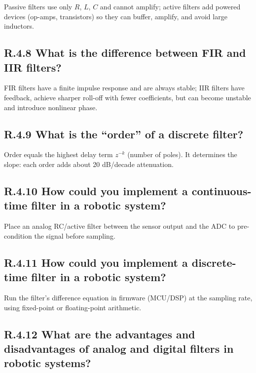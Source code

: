 \documentclass{article}
\begin{document}
Passive filters use only $R$, $L$, $C$ and cannot amplify; active filters add powered devices (op-amps, transistors) so they can buffer, amplify, and avoid large inductors.

\subsection*{R.4.8 What is the difference between FIR and IIR filters?}

FIR filters have a finite impulse response and are always stable; IIR filters have feedback, achieve sharper roll-off with fewer coefficients, but can become unstable and introduce nonlinear phase.

\subsection*{R.4.9 What is the “order” of a discrete filter?}

Order equals the highest delay term $z^{-k}$ (number of poles).  It determines the slope: each order adds about 20 dB/decade attenuation.

\subsection*{R.4.10 How could you implement a continuous-time filter in a robotic system?}

Place an analog RC/active filter between the sensor output and the ADC to pre-condition the signal before sampling.

\subsection*{R.4.11 How could you implement a discrete-time filter in a robotic system?}

Run the filter’s difference equation in firmware (MCU/DSP) at the sampling rate, using fixed-point or floating-point arithmetic.

\subsection*{R.4.12 What are the advantages and disadvantages of analog and digital filters in robotic systems?}
\end{document}

